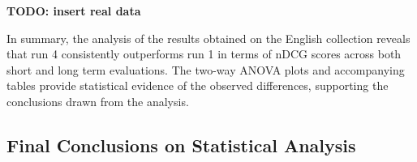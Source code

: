 \begin{center}
    \textbf{TODO: insert real data}
\end{center}

In summary, the analysis of the results obtained on the English collection reveals that run 4 consistently outperforms run 1 in terms of \ac{nDCG} scores across both short and long term evaluations. 
The two-way \ac{ANOVA} plots and accompanying tables provide statistical evidence of the observed differences, supporting the conclusions drawn from the analysis.

\subsection{Final Conclusions on Statistical Analysis}

































